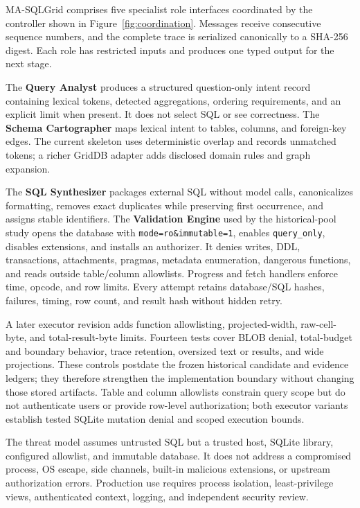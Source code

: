 \documentclass[information,article,submit,moreauthors]{Definitions/mdpi}
\newcommand{\masql}{MA-SQLGrid}
\begin{document}
\masql{} comprises five specialist role interfaces coordinated by the controller shown in Figure~\ref{fig:coordination}. Messages receive consecutive sequence numbers, and the complete trace is serialized canonically to a SHA-256 digest. Each role has restricted inputs and produces one typed output for the next stage.

The \textbf{Query Analyst} produces a structured question-only intent record containing lexical tokens, detected aggregations, ordering requirements, and an explicit limit when present. It does not select SQL or see correctness. The \textbf{Schema Cartographer} maps lexical intent to tables, columns, and foreign-key edges. The current skeleton uses deterministic overlap and records unmatched tokens; a richer GridDB adapter adds disclosed domain rules and graph expansion.

The \textbf{SQL Synthesizer} packages external SQL without model calls, canonicalizes formatting, removes exact duplicates while preserving first occurrence, and assigns stable identifiers. The \textbf{Validation Engine} used by the historical-pool study opens the database with \texttt{mode=ro\&immutable=1}, enables \texttt{query\_only}, disables extensions, and installs an authorizer. It denies writes, DDL, transactions, attachments, pragmas, metadata enumeration, dangerous functions, and reads outside table/column allowlists. Progress and fetch handlers enforce time, opcode, and row limits. Every attempt retains database/SQL hashes, failures, timing, row count, and result hash without hidden retry.

A later executor revision adds function allowlisting, projected-width, raw-cell-byte, and total-result-byte limits. Fourteen tests cover BLOB denial, total-budget and boundary behavior, trace retention, oversized text or results, and wide projections. These controls postdate the frozen historical candidate and evidence ledgers; they therefore strengthen the implementation boundary without changing those stored artifacts. Table and column allowlists constrain query scope but do not authenticate users or provide row-level authorization; both executor variants establish tested SQLite mutation denial and scoped execution bounds.

The threat model assumes untrusted SQL but a trusted host, SQLite library, configured allowlist, and immutable database. It does not address a compromised process, OS escape, side channels, built-in malicious extensions, or upstream authorization errors. Production use requires process isolation, least-privilege views, authenticated context, logging, and independent security review.
\end{document}
